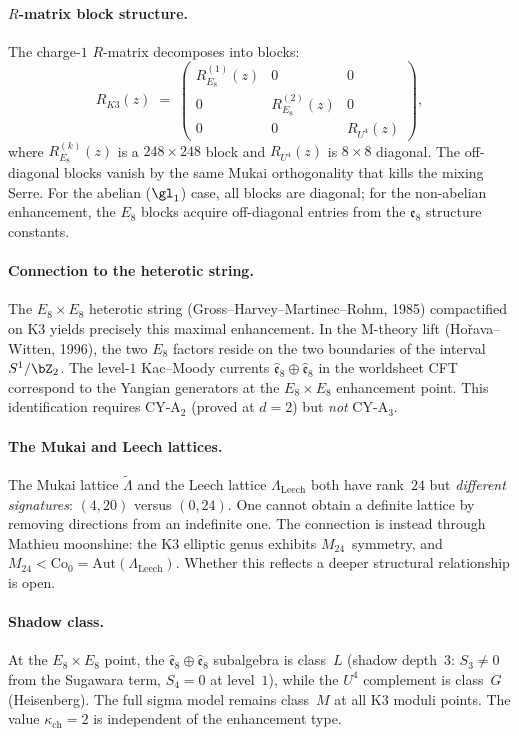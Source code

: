 \paragraph{\texorpdfstring{$R$}{R}-matrix block structure.}
The charge-$1$ $R$-matrix decomposes into blocks:
\[
 R_{K3}(z) \;=\;
 \begin{pmatrix}
 R_{E_8}^{(1)}(z) & 0 & 0 \\
 0 & R_{E_8}^{(2)}(z) & 0 \\
 0 & 0 & R_{U^4}(z)
 \end{pmatrix},
\]
where $R_{E_8}^{(k)}(z)$ is a $248 \times 248$ block and $R_{U^4}(z)$ is $8 \times 8$ diagonal. The off-diagonal blocks vanish by the same Mukai orthogonality that kills the mixing Serre. For the abelian ($\gl_1$) case, all blocks are diagonal; for the non-abelian enhancement, the $E_8$ blocks acquire off-diagonal entries from the $\mathfrak{e}_8$ structure constants.

\paragraph{Connection to the heterotic string.}
The $E_8 \times E_8$ heterotic string (Gross--Harvey--Martinec--Rohm, 1985) compactified on K3 yields precisely this maximal enhancement. In the M-theory lift (Ho\v{r}ava--Witten, 1996), the two $E_8$ factors reside on the two boundaries of the interval $S^1/\bZ_2$. The level-$1$ Kac--Moody currents $\widehat{\mathfrak{e}}_8 \oplus \widehat{\mathfrak{e}}_8$ in the worldsheet CFT correspond to the Yangian generators at the $E_8 \times E_8$ enhancement point. This identification requires CY-A$_2$ (proved at $d = 2$) but \emph{not} CY-A$_3$.

\paragraph{The Mukai and Leech lattices.}
The Mukai lattice $\widetilde{\Lambda}$ and the Leech lattice $\Lambda_{\mathrm{Leech}}$ both have rank~$24$ but \emph{different signatures}: $(4, 20)$ versus $(0, 24)$. One cannot obtain a definite lattice by removing directions from an indefinite one. The connection is instead through Mathieu moonshine: the K3 elliptic genus exhibits $M_{24}$~symmetry, and $M_{24} < \mathrm{Co}_0 = \mathrm{Aut}(\Lambda_{\mathrm{Leech}})$. Whether this reflects a deeper structural relationship is open.

\paragraph{Shadow class.}
At the $E_8 \times E_8$ point, the $\widehat{\mathfrak{e}}_8 \oplus \widehat{\mathfrak{e}}_8$ subalgebra is class~$L$ (shadow depth~$3$: $S_3 \neq 0$ from the Sugawara term, $S_4 = 0$ at level~$1$), while the $U^4$ complement is class~$G$ (Heisenberg). The full sigma model remains class~$M$ at all K3 moduli points. The value $\kappa_{\mathrm{ch}} = 2$ is independent of the enhancement type.

